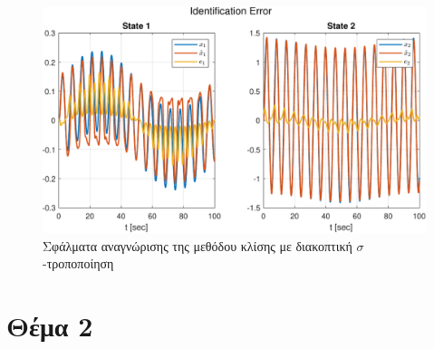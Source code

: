 \documentclass[a4paper,12pt]{article}
\begin{document}
\begin{figure}
    \centering
    \includegraphics[width=1\linewidth]{plot/task1_gradient_identification_error.pdf}
    \caption{Σφάλματα αναγνώρισης της μεθόδου κλίσης με διακοπτική $\sigma$-τροποποίηση}
    \label{fig:task1_gradient_identification_error}
\end{figure}

\section{Θέμα 2}
\end{document}
